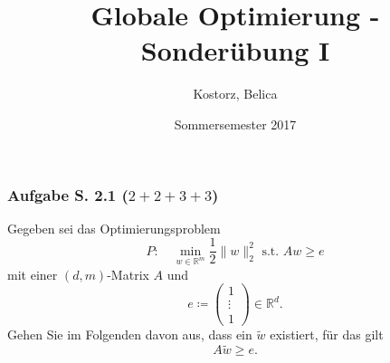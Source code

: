 \documentclass[12pt]{extreport} %
\title{Globale Optimierung - Sonderübung I}
\author{Kostorz, Belica}
\date{Sommersemester 2017}
\newcommand{\R}{\mathbb{R}}
\theoremstyle{named}
\theoremstyle{nnamed}
\theoremstyle{itshape}
\theoremstyle{normal}
\begin{document}
\thispagestyle{empty}


\thispagestyle{firststyle}

\subsubsection{Aufgabe S. 2.1 (\textit{$2 + 2 + 3 + 3$})} 

Gegeben sei das Optimierungsproblem
$$ P: \quad \min_{w \in \R^m} \frac{1}{2} \| w \|_2^2 \text{ s.t. } Aw \geq e $$
mit einer $(d, m)$-Matrix $A$ und
$$ e \coloneqq \left(\begin{array}{c} 1 \\ \vdots \\ 1 \end{array}\right) \in \R^d. $$
Gehen Sie im Folgenden davon aus, dass ein $\tilde{w}$ existiert, für das gilt
$$ A \tilde{w} \geq e. $$
\end{document}
